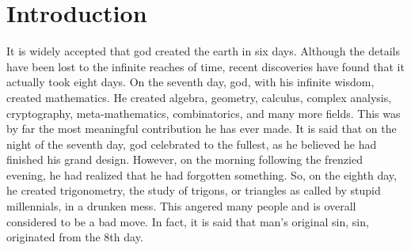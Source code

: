 \section{Introduction}

It is widely accepted that god created the earth in six days. Although the details have been lost to the infinite reaches of time, recent discoveries have found that it actually took eight days. On the seventh day, god, with his infinite wisdom, created mathematics. He created algebra, geometry, calculus, complex analysis, cryptography, meta-mathematics, combinatorics, and many more fields. This was by far the most meaningful contribution he has ever made. It is said that on the night of the seventh day, god celebrated to the fullest, as he believed he had finished his grand design. However, on the morning following the frenzied evening, he had realized that he had forgotten something. So, on the eighth day, he created trigonometry, the study of trigons, or triangles as called by stupid millennials, in a drunken mess. This angered many people and is overall considered to be a bad move. In fact, it is said that man’s original sin, sin, originated from the 8th day.
